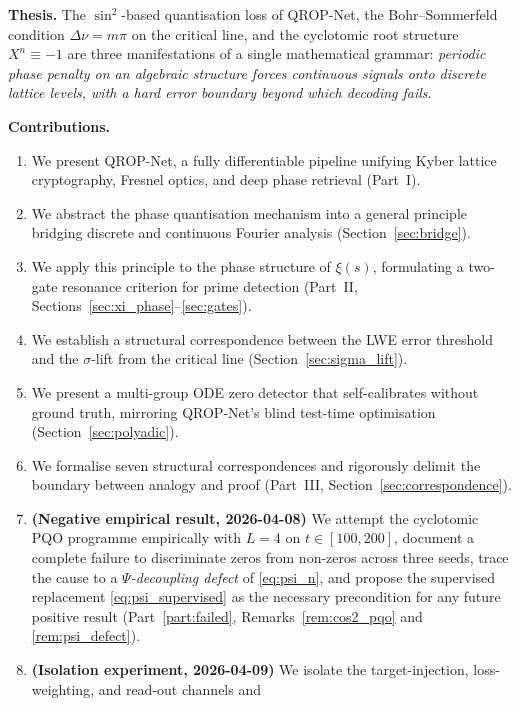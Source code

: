 \documentclass[11pt, a4paper]{article}
\theoremstyle{definition}
\theoremstyle{plain}
\newcommand{\xif}{\xi}                      %
\newcommand{\Psip}{\Psi}                    %
\begin{document}
\textbf{Thesis.} The $\sin^2$-based quantisation loss of QROP-Net, the
Bohr--Sommerfeld condition $\Delta\nu = m\pi$ on the critical line, and
the cyclotomic root structure $X^n \equiv -1$ are three manifestations
of a single mathematical grammar: \textit{periodic phase penalty on an
algebraic structure forces continuous signals onto discrete lattice levels,
with a hard error boundary beyond which decoding fails}.

\textbf{Contributions.}
\begin{enumerate}
  \item We present QROP-Net, a fully differentiable pipeline unifying
        Kyber lattice cryptography, Fresnel optics, and deep phase retrieval
        (Part~I).
  \item We abstract the phase quantisation mechanism into a general
        principle bridging discrete and continuous Fourier analysis
        (Section~\ref{sec:bridge}).
  \item We apply this principle to the phase structure of $\xif(s)$,
        formulating a two-gate resonance criterion for prime detection
        (Part~II, Sections~\ref{sec:xi_phase}--\ref{sec:gates}).
  \item We establish a structural correspondence between the LWE error
        threshold and the $\sigma$-lift from the critical line
        (Section~\ref{sec:sigma_lift}).
  \item We present a multi-group ODE zero detector that self-calibrates
        without ground truth, mirroring QROP-Net's blind test-time
        optimisation (Section~\ref{sec:polyadic}).
  \item We formalise seven structural correspondences and rigorously
        delimit the boundary between analogy and proof
        (Part~III, Section~\ref{sec:correspondence}).
  \item \textbf{(Negative empirical result, 2026-04-08)} We attempt
        the cyclotomic PQO programme empirically with $L=4$ on
        $t \in [100, 200]$, document a complete failure to discriminate
        zeros from non-zeros across three seeds, trace the cause to a
        \emph{$\Psip$-decoupling defect} of \cref{eq:psi_n}, and
        propose the supervised replacement \cref{eq:psi_supervised}
        as the necessary precondition for any future positive result
        (Part~\ref{part:failed}, Remarks~\ref{rem:cos2_pqo}
        and \ref{rem:psi_defect}).
  \item \textbf{(Isolation experiment, 2026-04-09)} We isolate the
        target-injection, loss-weighting, and read-out channels and

\end{enumerate}
\end{document}
